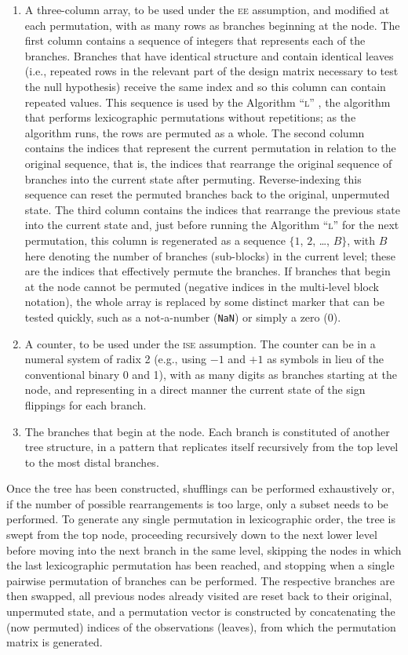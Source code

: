 \begin{enumerate}
\item A three-column array, to be used under the \textsc{ee} assumption, and modified at each permutation, with as many rows as branches beginning at the node. The first column contains a sequence of integers that represents each of the branches. Branches that have identical structure and contain identical leaves (i.e., repeated rows in the relevant part of the design matrix necessary to test the null hypothesis) receive the same index and so this column can contain repeated values. This sequence is used by the Algorithm ``\textsc{l}'' \citep{Knuth2005}, the algorithm that performs lexicographic permutations without repetitions; as the algorithm runs, the rows are permuted as a whole. The second column contains the indices that represent the current permutation in relation to the original sequence, that is, the indices that rearrange the original sequence of branches into the current state after permuting. Reverse-indexing this sequence can reset the permuted branches back to the original, unpermuted state. The third column contains the indices that rearrange the previous state into the current state and, just before running the Algorithm ``\textsc{l}'' for the next permutation, this column is regenerated as a sequence $\{1$, $2$, \ldots, $B\}$, with $B$ here denoting the number of branches (sub-blocks) in the current level; these are the indices that effectively permute the branches. If branches that begin at the node cannot be permuted (negative indices in the multi-level block notation), the whole array is replaced by some distinct marker that can be tested quickly, such as a not-a-number (\texttt{NaN}) or simply a zero (0).
\item A counter, to be used under the \textsc{ise} assumption. The counter can be in a numeral system of radix 2 (e.g., using $-1$ and $+1$ as symbols in lieu of the conventional binary 0 and 1), with as many digits as branches starting at the node, and representing in a direct manner the current state of the sign flippings for each branch.
\item The branches that begin at the node. Each branch is constituted of another tree structure, in a pattern that replicates itself recursively from the top level to the most distal branches.
\end{enumerate}

Once the tree has been constructed, shufflings can be performed exhaustively or, if the number of possible rearrangements is too large, only a subset needs to be performed. To generate any single permutation in lexicographic order, the tree is swept from the top node, proceeding recursively down to the next lower level before moving into the next branch in the same level, skipping the nodes in which the last lexicographic permutation has been reached, and stopping when a single pairwise permutation of branches can be performed. The respective branches are then swapped, all previous nodes already visited are reset back to their original, unpermuted state, and a permutation vector is constructed by concatenating the (now permuted) indices of the observations (leaves), from which the permutation matrix is generated.

